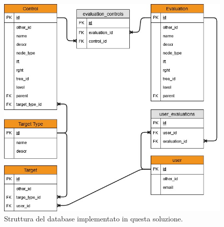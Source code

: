 \begin{figure}[ht!]
    \centering
    \includegraphics[scale=0.8]{images/MoonCloudRecommendation_ER.jpg}
    \caption[Struttura del database implementato in questa soluzione]{Struttura del database implementato in questa soluzione.}
    \label{fig:str_db_project}
\end{figure}
%
\newpage
%
